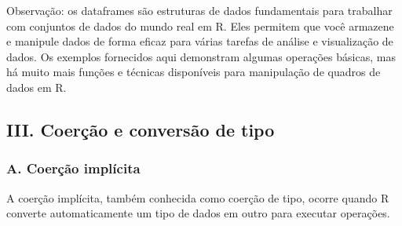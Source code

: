 \documentclass[
  letterpaper,
  DIV=11,
  numbers=noendperiod]{scrartcl}
\newenvironment{Shaded}{\begin{snugshade}}{\end{snugshade}}
\newcommand{\CommentTok}[1]{\textcolor[rgb]{0.37,0.37,0.37}{#1}}
\newcommand{\ConstantTok}[1]{\textcolor[rgb]{0.56,0.35,0.01}{#1}}
\newcommand{\DecValTok}[1]{\textcolor[rgb]{0.68,0.00,0.00}{#1}}
\newcommand{\FunctionTok}[1]{\textcolor[rgb]{0.28,0.35,0.67}{#1}}
\newcommand{\NormalTok}[1]{\textcolor[rgb]{0.00,0.23,0.31}{#1}}
\newcommand{\OtherTok}[1]{\textcolor[rgb]{0.00,0.23,0.31}{#1}}
\newcommand{\SpecialCharTok}[1]{\textcolor[rgb]{0.37,0.37,0.37}{#1}}
\newcommand{\StringTok}[1]{\textcolor[rgb]{0.13,0.47,0.30}{#1}}
\begin{document}
\begin{Shaded}
\end{Shaded}

Observação: os dataframes são estruturas de dados fundamentais para
trabalhar com conjuntos de dados do mundo real em R. Eles permitem que
você armazene e manipule dados de forma eficaz para várias tarefas de
análise e visualização de dados. Os exemplos fornecidos aqui demonstram
algumas operações básicas, mas há muito mais funções e técnicas
disponíveis para manipulação de quadros de dados em R.

\hypertarget{iii.-coeruxe7uxe3o-e-conversuxe3o-de-tipo}{%
\subsection{III. Coerção e conversão de
tipo}\label{iii.-coeruxe7uxe3o-e-conversuxe3o-de-tipo}}

\hypertarget{a.-coeruxe7uxe3o-impluxedcita}{%
\subsubsection{A. Coerção
implícita}\label{a.-coeruxe7uxe3o-impluxedcita}}

A coerção implícita, também conhecida como coerção de tipo, ocorre
quando R converte automaticamente um tipo de dados em outro para
executar operações.
\end{document}
